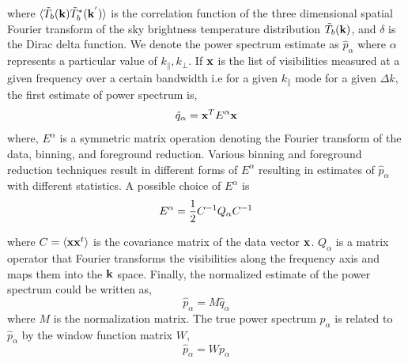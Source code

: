 \documentclass[twocolumn]{emulateapj}
\begin{document}
    where $\langle  \tilde T_{b}(\bold k) \tilde T_{b}^{*}(\bold k^{'}) \rangle $ is the correlation function of the three dimensional spatial Fourier transform of the sky brightness temperature distribution $ \tilde T_{b}(\bold k)$, and $\delta$ is the Dirac delta function. %
 We denote the power spectrum estimate as $\hat p_{\alpha}$ where $\alpha$ represents a particular value of $k_{\parallel}, k_{\perp}$. If $\bold x$ is the list of visibilities measured at a given frequency over a certain bandwidth i.e for a given $k_{\parallel}$ mode for a given $\Delta  k $, the first estimate of power spectrum is, 
    \begin{equation}
    \hat q_{\alpha} = \bold x^{T} E^{\alpha} \bold x %
    \label{eq15}
    \end{equation}
 where, $E^{\alpha}$ is a symmetric matrix operation denoting the Fourier transform of the data, binning, and foreground reduction. Various binning and foreground reduction techniques result in different forms of $E^{\alpha}$ resulting in estimates of $\hat p_{\alpha}$ with different statistics. A possible choice of $E^{\alpha}$ is
    \begin{equation}
    E^{\alpha} =  {1 \over 2} C^{-1} Q_{\alpha} C^{-1}
    \label{eq16}
    \end{equation} 
    
    where $C = \langle \bold x \bold x^{t} \rangle$ is the covariance matrix of the data vector $\bold x$. $Q_{\alpha}$ is a matrix operator that Fourier transforms the visibilities along the frequency axis and maps them into the $\bold k$ space. Finally, the normalized estimate of the power spectrum could be written as,  
    \begin{equation}
    \hat p_{\alpha} = M \hat q_{\alpha} 
    \label{eq17}
    \end{equation} 
    where $M$ is the normalization matrix.
 The true power spectrum $p_{\alpha}$ is related to $\hat p_{\alpha}$  by the window function matrix $W$, 
    \begin{equation}
    \hat p_{\alpha} = W p_{\alpha}
    \label{eq18}
    \end{equation} 
    
\end{document}
